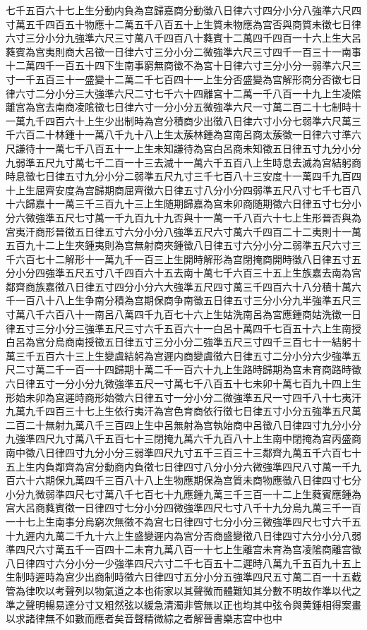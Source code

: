 七千五百六十七上生分動内負為宫歸嘉商分動徵八日律六寸四分小分八強準六尺四寸萬五千四百五十物應十二萬五千八百五十上生質未物應為宫否與商質未徵七日律六寸三分小分九強準六尺三寸萬八千四百八十蕤賓十二萬四千四百一十六上生大呂蕤賓為宫夷則商大呂徵一日律六寸三分小分二微強準六尺三寸四千一百三十一南事十二萬四千一百五十四下生南事窮無商徵不為宮十日律六寸三分小分一弱準六尺三寸一千五百三十一盛變十二萬二千七百四十一上生分否盛變為宫解形商分否徵七日律六寸二分小分三大強準六尺二寸七千六十四離宮十二萬一千八百一十九上生凌隂離宫為宫去南商凌隂徵七日律六寸一分小分五微強凖六尺一寸萬二百二十七制時十一萬九千四百六十上生少出制時為宫分積商少出徵八日律六寸小分七弱準六尺萬三千六百二十林鍾十一萬八千九十八上生太蔟林鍾為宫南呂商太蔟徵一日律六寸準六尺謙待十一萬七千八百五十一上生未知謙待為宫白呂商未知徵五日律五寸九分小分九弱準五尺九寸萬七千二百一十三去滅十一萬六千五百八上生時息去滅為宫結躬商時息徵七日律五寸九分小分二弱準五尺九寸三千七百八十三安度十一萬四千九百四十上生屈齊安度為宫歸期商屈齊徵六日律五寸八分小分四弱準五尺八寸七千七百八十六歸嘉十一萬三千三百九十三上生随期歸嘉為宫未卯商随期徵六日律五寸七分小分六微強準五尺七寸萬一千九百九十九否與十一萬一千八百六十七上生形晉否與為宫夷汗商形晉徵五日律五寸六分小分八強準五尺六寸萬六千四百二十二夷則十一萬五百九十二上生夾鍾夷則為宫無射商夾鍾徵八日律五寸六分小分二弱準五尺六寸三千六百七十二解形十一萬九千一百三上生開時解形為宫閉掩商開時徵八日律五寸五分小分四強準五尺五寸八千四百六十五去南十萬七千六百三十五上生族嘉去南為宫鄰齊商族嘉徵八日律五寸四分小分六大強準五尺四寸萬三千四百六十八分積十萬六千一百八十八上生争南分積為宫期保商争南徵五日律五寸三分小分九半強準五尺三寸萬八千六百八十一南呂八萬四千九百七十六上生姑洗南呂為宮應鍾商姑洗徵一日律五寸三分小分三強準五尺三寸六千五百六十一白呂十萬四千七百五十六上生南授白呂為宫分烏商南授徵五日律五寸三分小分二強準五尺三寸四千三百七十一結躬十萬三千五百六十三上生變虞結躬為宫遲内商變虞徵六日律五寸二分小分六少強準五尺二寸萬二千一百一十四歸期十萬二千一百六十九上生路時歸期為宫未育商路時徵六日律五寸一分小分九微強準五尺一寸萬七千八百五十七未卯十萬七百九十四上生形始未卯為宫遲時商形始徵六日律五寸一分小分二微強準五尺一寸四千八十七夷汗九萬九千四百三十七上生依行夷汗為宫色育商依行徵七日律五寸小分五強準五尺萬二百二十無射九萬八千三百四上生中呂無射為宫執始商中呂徵八日律四寸九分小分九強準四尺九寸萬八千五百七十三閉掩九萬六千九百八十上生南中閉掩為宫丙盛商南中徵八日律四寸九分小分三弱準四尺九寸五千三百三十三鄰齊九萬五千六百七十五上生内負鄰齊為宫分動商内負徵七日律四寸八分小分六微強準四尺八寸萬一千九百六十六期保九萬四千三百八十八上生物應期保為宫質未商物應徵八日律四寸七分小分九微弱準四尺七寸萬八千七百七十九應鍾九萬三千三百一十二上生蕤賓應鍾為宫大呂商蕤賓徵一日律四寸七分小分四微強準四尺七寸八千十九分烏九萬三千一百一十七上生南事分烏窮次無徵不為宫七日律四寸七分小分三微強準四尺七寸六千五十九遲内九萬二千九十六上生盛變遲内為宫分否商盛變徵八日律四寸六分小分八弱準四尺六寸萬五千一百四十二未育九萬八百一十七上生離宫未育為宫凌隂商離宫徵八日律四寸六分小分一少強準四尺六寸二千七百五十二遲時八萬九千五百九十五上生制時遲時為宫少出商制時徵六日律四寸五分小分五強準四尺五寸萬二百一十五截管為律吹以考聲列以物氣道之本也術家以其聲微而體難知其分數不明故作準以代之準之聲明暢易達分寸又粗然弦以緩急清濁非管無以正也均其中弦令與黄鍾相得案畫以求諸律無不如數而應者矣音聲精微綜之者解晉書樂志宫中也中